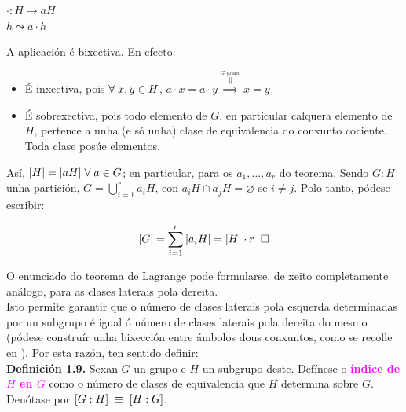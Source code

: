 \documentclass[twoside]{report}
\theoremstyle{mystyle}
\begin{document}
\vspace{2mm}

\begin{center}
    $\cdot : H \longrightarrow aH$ \\
    \vspace{2mm}
    \hspace{3mm} $h \leadsto a \cdot h$
\end{center}  

\vspace{2mm}

\noindent A aplicación é bixectiva. En efecto:

\begin{itemize}
    \item É inxectiva, pois $\forall \hspace{1mm} x,y \in H$, $a \cdot x = a \cdot y \overset{\overset{G \text{ grupo}}{\Downarrow}}{\implies} x = y$
    \item É sobrexectiva, pois todo elemento de $G$, en particular calquera elemento de $H$, pertence a unha (e só unha) clase de equivalencia do conxunto cociente. Toda clase posúe elementos.
\end{itemize} 

\noindent Así, $|H| = |aH| \hspace{1mm} \forall \hspace{1mm} a \in G$; en particular, para os $a_{1}, \dots, a_{r}$ do teorema. Sendo $G:H$ unha partición, $G = \bigcup\limits_{i = 1}^{r} a_{i}H$, con $a_{i}H \cap a_{j}H = \varnothing$ se $i \neq j$. Polo tanto, pódese escribir:

$$|G| = \sum_{i=1}^{r}{|a_{i}H|} = |H| \cdot r \hspace{2mm} \square$$ 

\vspace{3mm}

\noindent O enunciado do teorema de Lagrange pode formularse, de xeito completamente análogo, para as clases laterais pola dereita.\\

\noindent Isto permite garantir que o número de clases laterais pola esquerda determinadas por un subgrupo é igual ó número de clases laterais pola dereita do mesmo (pódese construír unha bixección entre ámbolos dous conxuntos, como se recolle en \cite{rotman}). Por esta razón, ten sentido definir: \\

\noindent \textbf{Definición 1.9.} Sexan $G$ un grupo e $H$ un subgrupo deste. Defínese o \textcolor{magenta}{\textbf{índice de $H$ en $G$}} como o número de clases de equivalencia que $H$ determina sobre $G$. Denótase por \textcolor{magenta}{$[G:H] \hspace{1mm} \equiv \hspace{1mm} [H:G]$}. 
\end{document}
